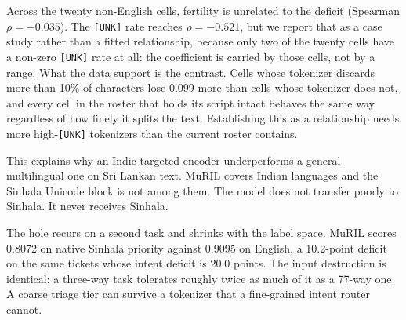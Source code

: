 Across the twenty non-English cells, fertility is unrelated to the deficit
(Spearman $\rho=-0.035$). The \texttt{[UNK]} rate reaches $\rho=-0.521$, but we
report that as a case study rather than a fitted relationship, because only two
of the twenty cells have a non-zero \texttt{[UNK]} rate at all: the coefficient
is carried by those cells, not by a range. What the data support is the
contrast. Cells whose tokenizer discards more than 10\% of characters lose 0.099
more than cells whose tokenizer does not, and every cell in the roster that
holds its script intact behaves the same way regardless of how finely it splits
the text. Establishing this as a relationship needs more high-\texttt{[UNK]}
tokenizers than the current roster contains.

This explains why an Indic-targeted encoder underperforms a general multilingual
one on Sri Lankan text. MuRIL covers Indian languages and the Sinhala Unicode
block is not among them. The model does not transfer poorly to Sinhala. It never
receives Sinhala.

The hole recurs on a second task and shrinks with the label space. MuRIL scores
0.8072 \macrof{} on native Sinhala priority against 0.9095 on English, a
10.2-point deficit on the same tickets whose intent deficit is 20.0 points. The
input destruction is identical; a three-way task tolerates roughly twice as much
of it as a 77-way one. A coarse triage tier can survive a tokenizer that a
fine-grained intent router cannot.
